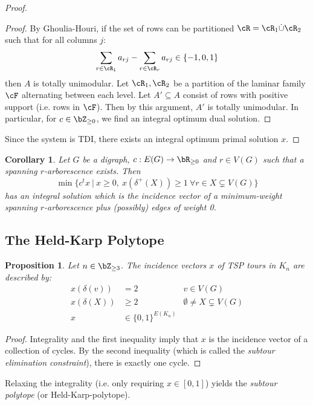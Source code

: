 \documentclass[11pt, a4paper]{article}
\newcommand{\set}[1]{\{#1\}}
\newtheorem{cor}[theorem]{Corollary}
\newtheorem{prop}[theorem]{Proposition}
\theoremstyle{remark}
\theoremstyle{definition}
\begin{document}
\begin{proof}
\begin{proof}
		By Ghoulia-Houri, if the set of rows can be partitioned
		$\cR=\cR_1\dot\cup \cR_2$ such that for all columns $j$:
		\[\sum_{r\in\cR_1}a_{rj}-\sum_{r\in\cR_r}a_{rj}\in\set{-1,0,1}\]
		then $A$ is totally unimodular. Let $\cR_1,\cR_2$ be a partition of
		the laminar family $\cF$ alternating between each level. Let
		$A'\subseteq A$ consist of rows with positive support (i.e. rows in
		$\cF$). Then by this argument, $A'$ is totally unimodular. In
		particular, for $c\in \bZ_{\geq0}$, we find an integral optimum dual
		solution.
	\end{proof}
	Since the system is TDI, there exists an integral optimum primal solution
	$x$.
\end{proof}

\begin{cor}
	Let $G$ be a digraph, $c: E(G)\to\bR_{\geq0}$ and $r\in V(G)$ such that
	a spanning $r$-arborescence exists. Then
	\[\min\set{c^tx\ |\ x\geq0,\ x(\delta^+(X))\geq1\ \forall r\in X\subsetneq V(G)}\]
	has an integral solution which is the incidence vector of a
	minimum-weight spanning $r$-arborescence plus (possibly) edges of
	weight 0.
\end{cor}

\subsection{The Held-Karp Polytope}

\begin{prop}\label{prop:subtour-polytope}
	Let $n\in\bZ_{\geq3}$. The incidence vectors $x$ of TSP tours in $K_n$ are
	described by:
	\begin{align*}
		x(\delta(v)) & =2                     & v\in V(G)                      \\
		x(\delta(X)) & \geq2                  & \emptyset\neq X\subsetneq V(G) \\
		x            & \in \set{0,1}^{E(K_n)}
	\end{align*}
\end{prop}
\begin{proof}
	Integrality and the first inequality imply that $x$ is the incidence
	vector of a collection of cycles. By the second inequality (which is
	called the \emph{subtour elimination constraint}), there is
	exactly one cycle.
\end{proof}
Relaxing the integrality (i.e. only requiring $x\in[0,1]$) yields the
\emph{subtour polytope} (or Held-Karp-polytope).
\end{document}
